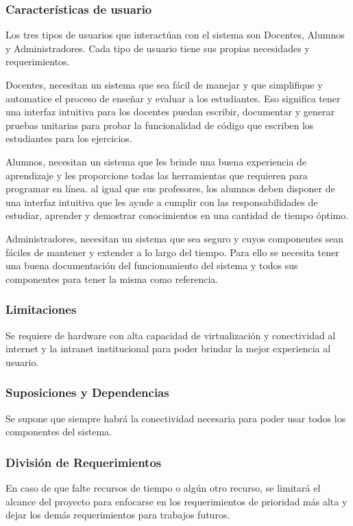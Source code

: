 \subsubsection{Características de usuario}
Los tres tipos de usuarios que interactúan con el sistema son Docentes, Alumnos y Administradores. Cada tipo de usuario tiene sus propias necesidades y requerimientos.

    
Docentes, necesitan un sistema que sea fácil de manejar y que simplifique y automatice el proceso de enseñar y evaluar a los estudiantes. Eso significa tener una interfaz intuitiva para los docentes puedan escribir, documentar y generar pruebas unitarias para probar la funcionalidad de código que escriben los estudiantes para los ejercicios.

 
Alumnos, necesitan un sistema que les brinde una buena experiencia de aprendizaje y les proporcione todas las herramientas que requieren para programar en línea. al igual que sus profesores, los alumnos deben disponer de una interfaz intuitiva que les ayude a cumplir con las responsabilidades de estudiar, aprender y demostrar conocimientos en una cantidad de tiempo óptimo.

Administradores, necesitan un sistema que sea seguro y cuyos componentes sean fáciles de mantener y extender a lo largo del tiempo. Para ello se necesita tener una buena documentación del funcionamiento del sistema y todos sus componentes para tener la misma como referencia.

\subsubsection{Limitaciones}
Se requiere de hardware con alta capacidad de virtualización y conectividad al internet y la intranet institucional para poder brindar la mejor experiencia al usuario.

\subsubsection{Suposiciones y Dependencias}
Se supone que siempre habrá la conectividad necesaria para poder usar todos los componentes del sistema.

\subsubsection{División de Requerimientos}
En caso de que falte recursos de tiempo o algún otro recurso, se limitará el alcance del proyecto para enfocarse en los requerimientos de prioridad más alta y dejar los demás requerimientos para trabajos futuros.

